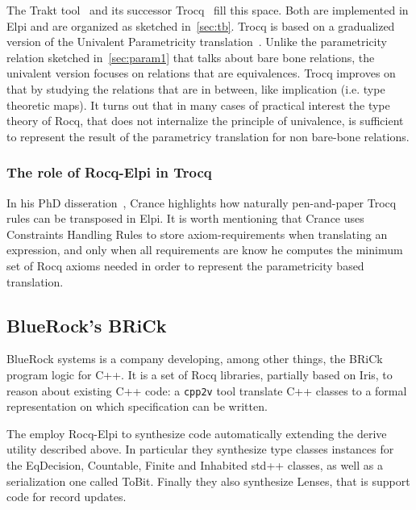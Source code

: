 \documentclass[a4paper, 11pt]{book}
\begin{document}
The Trakt tool~\cite{DBLP:conf/cpp/Blot0CPKMV23} and its successor
Trocq~\cite{10.1007/978-3-031-57262-3_10} fill this space. Both
are implemented in Elpi and are organized as sketched in~\ref{sec:tb}.
Trocq is based on a gradualized version of the Univalent Parametricity
translation~\cite{10.1145/3429979}. Unlike the parametricity relation
sketched in~\ref{sec:param1} that talks about bare bone relations, the univalent
version focuses on relations that are equivalences.
Trocq improves on that by studying the relations that are in between,
like implication (i.e. type theoretic maps).
It turns out that in many cases of practical interest the type
theory of Rocq, that does not internalize the principle of univalence, is
sufficient to represent the result of the parametricy translation
for non bare-bone relations.

\subsubsection{The role of Rocq-Elpi in Trocq}

In his PhD disseration~\cite[Page 115]{enzo}, Crance
highlights how naturally pen-and-paper Trocq rules can be transposed in Elpi.
It is worth mentioning that Crance uses Constraints Handling Rules to
store axiom-requirements when translating an expression, and only when
all requirements are know he computes the minimum set of Rocq axioms
needed in order to represent the parametricity based translation.



\subsection{BlueRock's BRiCk}

BlueRock systems is a company developing, among other things, the BRiCk
program logic for C++. It is a set of Rocq libraries, partially based on Iris,
to reason about existing C++ code: a \texttt{cpp2v} tool translate C++
classes to a formal representation on which specification can be written.

The employ Rocq-Elpi to synthesize code automatically extending the
derive utility described above. In particular they synthesize
type classes instances for the EqDecision, Countable, Finite and Inhabited
std++ classes, as well as a serialization one called ToBit. Finally
they also synthesize Lenses, that is support code for record updates.
\end{document}

